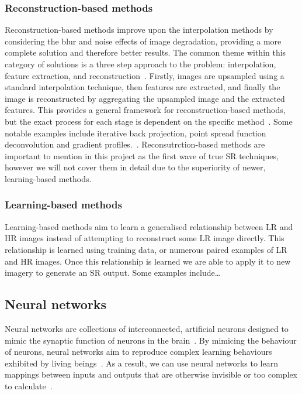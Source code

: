 \subsubsection{Reconstruction-based methods}
Reconstruction-based methods improve upon the interpolation methods by considering the blur and noise effects of image degradation, providing a more complete solution and therefore better results. The common theme within this category of solutions is a three step approach to the problem: interpolation, feature extraction, and reconstruction~\cite{superResRemoteSensingOverview}. Firstly, images are upsampled using a standard interpolation technique, then features are extracted, and finally the image is reconstructed by aggregating the upsampled image and the extracted features. This provides a general framework for reconstruction-based methods, but the exact process for each stage is dependent on the specific method~\cite{superResRemoteSensingOverview}. Some notable examples include iterative back projection, point spread function deconvolution and gradient profiles.~\cite{superResRemoteSensingOverview}. Reconsutrction-based methods are important to mention in this project as the first wave of true SR techniques, however we will not cover them in detail due to the superiority of newer, learning-based methods.

\subsubsection{Learning-based methods}
Learning-based methods aim to learn a generalised relationship between LR and HR images instead of attempting to reconstruct some LR image directly. This relationship is learned using training data, or numerous paired examples of LR and HR images. Once this relationship is learned we are able to apply it to new imagery to generate an SR output. Some examples include\dots

\subsection{Neural networks}\label{subsec:neural_networks}
Neural networks are collections of interconnected, artificial neurons designed to mimic the synaptic function of neurons in the brain~\cite{ref}. By mimicing the behaviour of neurons, neural networks aim to reproduce complex learning behaviours exhibited by living beings~\cite{ref}. As a result, we can use neural networks to learn mappings between inputs and outputs that are otherwise invisible or too complex to calculate~\cite{ref}.

